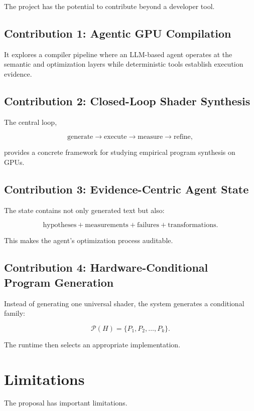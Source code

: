 \documentclass[11pt,a4paper,oneside]{report}
\begin{document}
The project has the potential to contribute beyond a developer tool.

\section{Contribution 1: Agentic GPU Compilation}

It explores a compiler pipeline where an LLM-based agent operates at the semantic and optimization
layers while deterministic tools establish execution evidence.

\section{Contribution 2: Closed-Loop Shader Synthesis}

The central loop,

\[
\text{generate}\rightarrow\text{execute}\rightarrow\text{measure}\rightarrow\text{refine},
\]

provides a concrete framework for studying empirical program synthesis on GPUs.

\section{Contribution 3: Evidence-Centric Agent State}

The state contains not only generated text but also:

\[
\text{hypotheses}+\text{measurements}+\text{failures}+\text{transformations}.
\]

This makes the agent's optimization process auditable.

\section{Contribution 4: Hardware-Conditional Program Generation}

Instead of generating one universal shader, the system generates a conditional family:

\[
\mathcal{P}(H)=\{P_1,P_2,\ldots,P_k\}.
\]

The runtime then selects an appropriate implementation.

\chapter{Limitations}

The proposal has important limitations.
\end{document}
